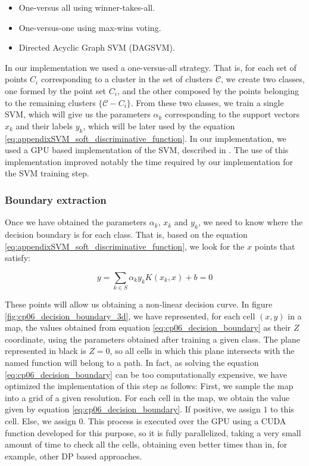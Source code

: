 \begin{itemize}
 \item One-versus all using winner-takes-all.
 \item One-versus-one using max-wins voting.
 \item Directed Acyclic Graph SVM (DAGSVM).
\end{itemize}

In our implementation we used a one-versus-all strategy. That is, for each set of points $C_i$ corresponding to a cluster in the set of clusters $\mathcal{C}$, we create two classes, one formed by the point set $C_i$, and the other composed by the points belonging to the remaining clusters $\{\mathcal{C} - C_i\}$. From these two classes, we train a single \ac{SVM}, which will give us the parameters $\alpha_k$ corresponding to the support vectors $x_k$ and their labels $y_k$, which will be later used by the equation \ref{eq:appendixSVM_soft_discriminative_function}. In our implementation, we used a \acs{GPU} based implementation of the \ac{SVM}, described in \cite{athanasopoulos2011gpu}. The use of this implementation improved notably the time required by our implementation for the \ac{SVM} training step.

\subsubsection{Boundary extraction}\label{ch:chapter06_01_01_04}

Once we have obtained the parameters $\alpha_k$, $x_k$ and $y_k$, we need to know where the decision boundary is for each class. That is, based on the equation \ref{eq:appendixSVM_soft_discriminative_function}, we look for the $x$ points that satisfy:

\begin{equation}\label{eq:cp06_decision_boundary}
 y = \sum_{k \in S} \alpha_k y_k K(x_k, x) + b = 0
\end{equation}

These points will allow us obtaining a non-linear decision curve. In figure \ref{fig:cp06_decision_boundary_3d}, we have represented, for each cell $(x,y)$ in a map, the values obtained from equation \ref{eq:cp06_decision_boundary} as their $Z$ coordinate, using the parameters obtained after training a given class. The plane represented in black is $Z=0$, so all cells in which this plane intersects with the named function will belong to a path.
In fact, as solving the equation \ref{eq:cp06_decision_boundary} can be too computationally expensive, we have optimized the implementation of this step as follows: First, we sample the map into a grid of a given resolution. For each cell in the map, we obtain the value given by equation \ref{eq:cp06_decision_boundary}. If positive, we assign $1$ to this cell. Else, we assign $0$. This process is executed over the \ac{GPU} using a \ac{CUDA} function developed for this purpose, so it is fully parallelized, taking a very small amount of time to check all the cells, obtaining even better times than in, for example, other \ac{DP} based approaches.


